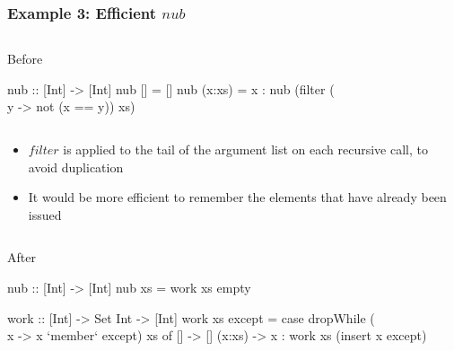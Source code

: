 \documentclass[smaller]{beamer}
\newcommand{\Varid}[1]{\mathit{#1}}
\begin{document}
\begin{frame}[fragile]
\frametitle{Example 3: Efficient \ensuremath{\Varid{nub}}}

\begin{columns}[t] 
\begin{column}{0.8\textwidth}
\begin{block}{Before}
{\footnotesize\begin{semiverbatim}
\alert{nub :: [Int] -> [Int]}
nub [] = []
nub (x:xs) = x : nub (filter (\\y -> not (x == y)) xs)
\end{semiverbatim}}
\end{block}
\end{column}
\end{columns}

\vskip 0.2in
{\footnotesize\begin{itemize}
\item \ensuremath{\Varid{filter}} is applied to the tail of the argument list on each recursive call, to avoid duplication
\item It would be more efficient to remember the elements that have already been issued
\end{itemize}}
\begin{columns}[t] 
\begin{column}{0.8\textwidth}
\begin{block}{After}
{\footnotesize\begin{semiverbatim}
nub :: [Int] -> [Int]
nub xs = work xs empty
 
\alert{work :: [Int] -> Set Int -> [Int]}
work xs except = 
  case dropWhile (\\ x -> x `member` except) xs of
    [] -> []
    (x:xs) -> x : work xs (insert x except)
\end{semiverbatim}}
\end{block}
\end{column}
\end{columns}

\end{frame}
\end{document}
